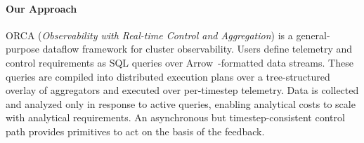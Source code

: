 
\paragraph{Our Approach}
ORCA (\emph{Observability with Real-time Control and Aggregation}) is a general-purpose dataflow
framework for cluster observability.
Users define telemetry and control requirements as SQL queries over
Arrow~\cite{:ApacheArrow}-formatted data streams.
These queries are compiled into distributed execution plans over a tree-structured overlay of
aggregators and executed over per-timestep telemetry.
Data is collected and analyzed only in response to active queries, enabling analytical costs to
scale with analytical requirements.
An asynchronous but timestep-consistent control path provides primitives to act on the basis of the
feedback.


